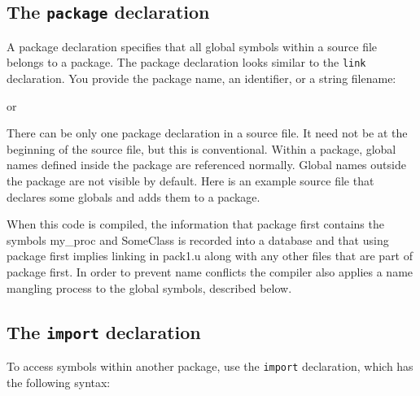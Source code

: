 \subsection*{The \texttt{package} declaration}

A package declaration specifies that all global symbols within a source file
belongs to a package.  The package declaration looks similar to the
\texttt{link} declaration. You provide the package name, an
identifier, or a string filename:


or


There can be only one package declaration in a source file. It need not be at
the beginning of the source file, but this is conventional.  Within a package,
global names defined inside the package are referenced normally. Global names
outside the package are not visible by default. Here is an example source file
that declares some globals and adds them to a package.

\bigskip


When this code is compiled, the information that package first contains
the symbols \textsf{my\_proc} and \textsf{SomeClass} is recorded into a
database and that using package \textsf{first} implies linking in
\textsf{pack1.u} along with any other files that are part of package
\textsf{first}. In order to prevent name conflicts the compiler also
applies a name mangling process to the global symbols, described below.

\subsection*{The \texttt{import} declaration}

To access symbols within another package, use the \texttt{import} declaration,
which has the following syntax:

